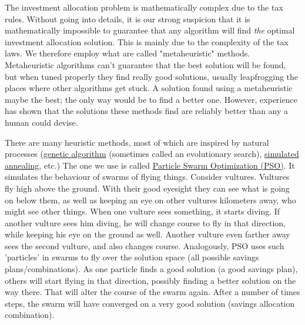 \documentclass[a4paper, justified]{tufte-handout}
\begin{document}
The investment allocation problem is mathematically complex due to the tax rules. Without going into details, it is our strong suspicion that it is mathematically impossible to guarantee that any algorithm will find \textit{the} optimal investment allocation solution. This is mainly due to the complexity of the tax laws. We therefore employ what are called "metaheuristic" methods. Metaheuristic algorithms can't guarantee that the best solution will be found, but when tuned properly they find really good solutions, usually leapfrogging the places where other algorithms get stuck. A solution found using a metaheuristic maybe the best; the only way would be to find a better one. However, experience has shown that the solutions these methods find are reliably better than any a human could devise.

There are many heuristic methods, most of which are inspired by natural processes (\href{https://en.wikipedia.org/wiki/Genetic_algorithm}{genetic algorithm} (sometimes called an evolutionary search), \href{https://en.wikipedia.org/wiki/Simulated_annealing}{simulated annealing}, etc.) The one we use is called \href{https://en.wikipedia.org/wiki/Particle_swarm_optimization}{Particle Swarm Optimization (PSO)}. It simulates the behaviour of swarms of flying things. Consider vultures. Vultures fly high above the ground. With their good eyesight they can see what is going on below them, as well as keeping an eye on other vultures kilometers away, who might see other things. When one vulture sees something, it starts diving. If another vulture sees him diving, he will change course to fly in that direction, while keeping his eye on the ground as well. Another vulture even farther away sees the second vulture, and also changes course. Analogously, PSO uses such 'particles' in swarms to fly over the solution space (all possible savings plans/combinations). As one particle finds a good solution (a good savings plan), others will start flying in that direction, possibly finding a better solution on the way there. That will alter the course of the swarm again. After a number of times steps, the swarm will have converged on a very good solution (savings allocation combination).
\end{document}
